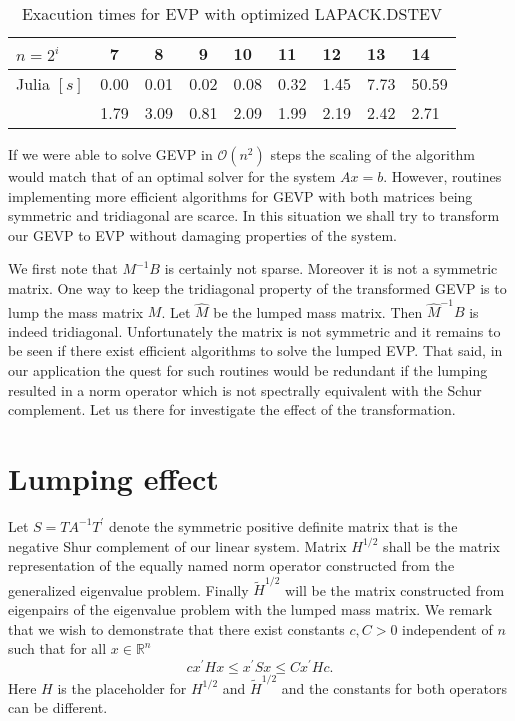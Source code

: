 \documentclass[10pt, a4paper]{article}
\newcommand{\reals}{\mathbb{R}}
\newcommand{\dual}[1]{\ensuremath{{#1}^{\prime}}}
\begin{document}
\begin{table}[ht]
\caption{Exacution times for EVP with optimized LAPACK.DSTEV}
\label{tab:eig_scale_std}
\footnotesize{
\begin{tabular}{l|SSSLLLPP}
$n=2^i$                 &    7 &    8 &    9 &   10 &   11 & 12     & 13      & 14\\
\hline
 Julia $\left[s\right]$ & 0.00 & 0.01 & 0.02 & 0.08 & 0.32 & 1.45 & 7.73 & 50.59\\
                        & 1.79 & 3.09 & 0.81 & 2.09 & 1.99 & 2.19 & 2.42 & 2.71\\
\end{tabular}
}
\end{table}
%

If we were able to solve GEVP in $\mathcal{O}(n^2)$ steps the scaling of the
algorithm would match that of an optimal solver for the system $Ax=b$. However,
routines implementing more efficient algorithms for GEVP with both matrices
being symmetric and tridiagonal are scarce. In this situation we shall try to
transform our GEVP to EVP without damaging properties of the system. 

We first note that $M^{-1} B$ is certainly not sparse. Moreover it is not a symmetric 
matrix. One way to keep the tridiagonal property of the transformed GEVP is to lump 
the mass matrix $M$. Let $\hat{M}$ be the lumped mass matrix. Then $\hat{M}^{-1} B$ 
is indeed tridiagonal. Unfortunately the matrix is not symmetric and it remains to 
be seen if there exist efficient algorithms to solve the lumped EVP. That said,
in our application the quest for such routines would be redundant if the lumping
resulted in a norm operator which is not spectrally equivalent with the Schur
complement. Let us there for investigate the effect of the transformation.

\section*{Lumping effect}
Let $S=TA^{-1}\dual{T}$ denote the symmetric positive definite matrix that is the
negative Shur complement of our linear system. Matrix $H^{1/2}$ shall be the
matrix representation of the equally named norm operator constructed from the
generalized eigenvalue problem. Finally $\tilde{H}^{1/2}$ will be the matrix 
constructed from eigenpairs of the eigenvalue problem with the lumped mass
matrix. We remark that we wish to demonstrate that there exist constants $c, C>0$
independent of $n$ such that for all $x\in\reals^n$
%
\begin{equation}\label{eq:equiv}
  c\dual{x} H x \leq \dual{x} S x \leq  C\dual{x} H c.
\end{equation}
Here $H$ is the placeholder for $H^{1/2}$ and $\tilde{H}^{1/2}$ and the
constants for both operators can be different.
\end{document}
